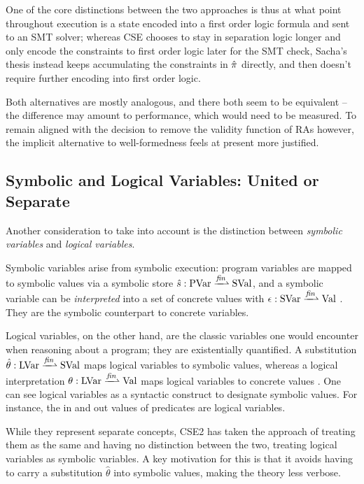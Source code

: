 {One of the core distinctions between the two approaches is thus at what point throughout execution is a state encoded into a first order logic formula and sent to an SMT solver; whereas CSE chooses to stay in separation logic longer and only encode the constraints to first order logic later for the SMT check, Sacha's thesis instead keeps accumulating the constraints in $\hat \pi$ directly, and then doesn't require further encoding into first order logic.

Both alternatives are mostly analogous, and there both seem to be equivalent -- the difference may amount to performance, which would need to be measured. To remain aligned with the decision to remove the validity function of RAs however, the implicit alternative to well-formedness feels at present more justified.
}

\subsection{Symbolic and Logical Variables: United or Separate}

Another consideration to take into account is the distinction between \emph{symbolic variables} and \emph{logical variables}.

Symbolic variables arise from symbolic execution: program variables are mapped to symbolic values via a symbolic store $\hat s:\text{PVar}\finmap \text{SVal}$, and a symbolic variable can be \emph{interpreted} into a set of concrete values with $\epsilon:\text{SVar}\finmap\text{Val}$ \cite{cse1}. They are the symbolic counterpart to concrete variables.

Logical variables, on the other hand, are the classic variables one would encounter when reasoning about a program; they are existentially quantified. A substitution ${\hat\theta:\text{LVar}\finmap\text{SVal}}$ maps logical variables to symbolic values, whereas a logical interpretation $\theta:\text{LVar}\finmap\text{Val}$ maps logical variables to concrete values \cite{cse1}. One can see logical variables as a syntactic construct to designate symbolic values. For instance, the in and out values of predicates are logical variables.

While they represent separate concepts, CSE2 has taken the approach of treating them as the same and having no distinction between the two, treating logical variables as symbolic variables. A key motivation for this is that it avoids having to carry a substitution $\hat\theta$ into symbolic values, making the theory less verbose.

